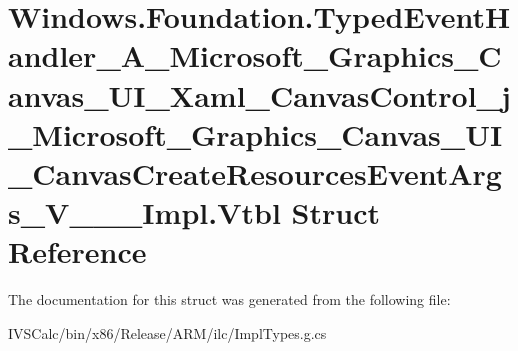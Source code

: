 \hypertarget{struct_windows_1_1_foundation_1_1_typed_event_handler___a___microsoft___graphics___canvas___u_i_b71feb89b74ea184800ffb90c672de94}{}\section{Windows.\+Foundation.\+Typed\+Event\+Handler\+\_\+\+A\+\_\+\+Microsoft\+\_\+\+Graphics\+\_\+\+Canvas\+\_\+\+U\+I\+\_\+\+Xaml\+\_\+\+Canvas\+Control\+\_\+j\+\_\+\+Microsoft\+\_\+\+Graphics\+\_\+\+Canvas\+\_\+\+U\+I\+\_\+\+Canvas\+Create\+Resources\+Event\+Args\+\_\+\+V\+\_\+\+\_\+\+\_\+\+Impl.\+Vtbl Struct Reference}
\label{struct_windows_1_1_foundation_1_1_typed_event_handler___a___microsoft___graphics___canvas___u_i_b71feb89b74ea184800ffb90c672de94}


The documentation for this struct was generated from the following file\+:\begin{DoxyCompactItemize}
\item 
I\+V\+S\+Calc/bin/x86/\+Release/\+A\+R\+M/ilc/Impl\+Types.\+g.\+cs\end{DoxyCompactItemize}
